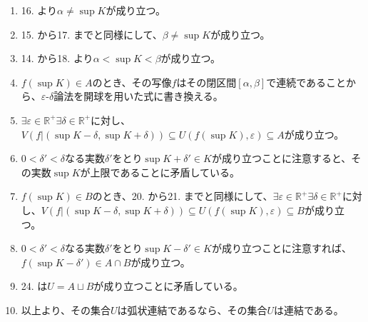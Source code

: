 \documentclass[dvipdfmx]{jsarticle}
\begin{document}
\begin{enumerate}
\item
  16. より$\alpha \neq \sup K$が成り立つ。
\item
  15. から17. までと同様にして、$\beta \neq \sup K$が成り立つ。
\item
  14. から18. より$\alpha < \sup K < \beta$が成り立つ。
\item
  $f\left( \sup K \right) \in A$のとき、その写像$f$はその閉区間$[\alpha,\beta]$で連続であることから、$\varepsilon$-$\delta$論法を開球を用いた式に書き換える。
\item
  $\exists\varepsilon \in \mathbb{R}^{+}\exists\delta \in \mathbb{R}^{+}$に対し、$V\left( f|\left( \sup K - \delta,\sup K + \delta \right) \right) \subseteq U\left( f\left( \sup K \right),\varepsilon \right) \subseteq A$が成り立つ。
\item
  $0 < \delta' < \delta$なる実数$\delta'$をとり$\sup K + \delta' \in K$が成り立つことに注意すると、その実数$\sup K$が上限であることに矛盾している。
\item
  $f\left( \sup K \right) \in B$のとき、20. から21. までと同様にして、$\exists\varepsilon \in \mathbb{R}^{+}\exists\delta \in \mathbb{R}^{+}$に対し、$V\left( f|\left( \sup K - \delta,\sup K + \delta \right) \right) \subseteq U\left( f\left( \sup K \right),\varepsilon \right) \subseteq B$が成り立つ。
\item
  $0 < \delta' < \delta$なる実数$\delta'$をとり$\sup K - \delta' \in K$が成り立つことに注意すれば、$f\left( \sup K - \delta' \right) \in A \cap B$が成り立つ。
\item
  24. は$U = A \sqcup B$が成り立つことに矛盾している。
\item
  以上より、その集合$U$は弧状連結であるなら、その集合$U$は連結である。
\end{enumerate}
\end{document}
